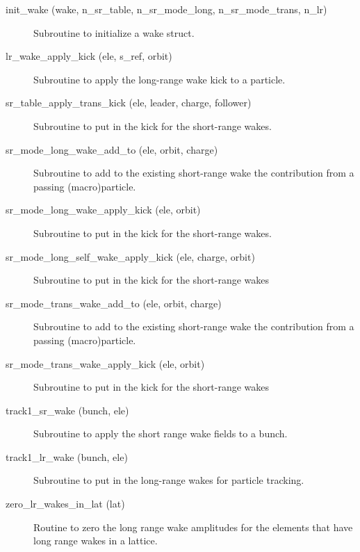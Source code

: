 \begin{description}

\item[init_wake (wake, n_sr_table, n_sr_mode_long, n_sr_mode_trans, n_lr)] \Newline 
Subroutine to initialize a wake struct.

\item[lr_wake_apply_kick (ele, s_ref, orbit)] \Newline 
Subroutine to apply the long-range wake kick to a particle.

\item[sr_table_apply_trans_kick (ele, leader, charge, follower)] \Newline 
Subroutine to put in the kick for the short-range wakes.

\item[sr_mode_long_wake_add_to (ele, orbit, charge)] \Newline 
Subroutine to add to the existing short-range wake the contribution from
a passing (macro)particle.

\item[sr_mode_long_wake_apply_kick (ele, orbit)] \Newline 
Subroutine to put in the kick for the short-range wakes.

\item[sr_mode_long_self_wake_apply_kick (ele, charge, orbit)] \Newline 
Subroutine to put in the kick for the short-range wakes

\item[sr_mode_trans_wake_add_to (ele, orbit, charge)] \Newline 
Subroutine to add to the existing short-range wake the contribution from
a passing (macro)particle.

\item[sr_mode_trans_wake_apply_kick (ele, orbit)] \Newline 
Subroutine to put in the kick for the short-range wakes

\item[track1_sr_wake (bunch, ele)] \Newline 
Subroutine to apply the short range wake fields to a bunch. 

\item[track1_lr_wake (bunch, ele)] \Newline 
Subroutine to put in the long-range wakes for particle tracking.

\item[zero_lr_wakes_in_lat (lat)] \Newline 
Routine to zero the long range wake amplitudes for the elements that have
long range wakes in a lattice.

\end{description}

